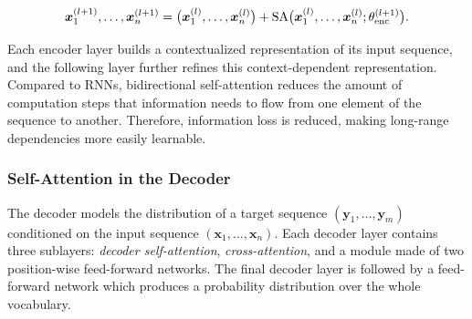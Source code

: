 \begin{equation}
    \bm{x}^{(l+1)}_1, \ldots, \bm{x}^{(l+1)}_n = \bigl(\bm{x}^{(l)}_1, \ldots, \bm{x}^{(l)}_n\bigr) + \textrm{SA}\bigl(\bm{x}^{(l)}_1, \ldots, \bm{x}^{(l)}_n; \theta^{(l+1)}_{\textrm{enc}}\bigr). \\
\end{equation}




Each encoder layer builds a contextualized representation of its input sequence, and the following layer further refines this context-dependent representation. Compared to \acp{RNN}, bidirectional self-attention reduces the amount of computation steps that information needs to flow from one element of the sequence to another. Therefore, information loss is reduced, making long-range dependencies more easily learnable. 

\subsubsection{Self-Attention in the Decoder} 
\label{subsubsection:related-pretrained-language-models-unidirectional-sa}

The decoder models the distribution of a target sequence $(\bm{y}_1, \ldots, \bm{y}_m)$ conditioned on the input sequence $(\bm{x}_1, \ldots, \bm{x}_n)$. Each decoder layer contains three sublayers: \textit{decoder self-attention}, \textit{cross-attention}, and a module made of two position-wise feed-forward networks. The final decoder layer is followed by a feed-forward network which produces a probability distribution over the whole vocabulary. 

